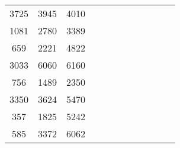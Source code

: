 \begin{table}[tb]
\begin{tabular}{|c|c|c|ccccccccc}
		3725 & 3945 & 4010 &                           &                           &                           &                           &                           &                           &                           &                           &                           \\ \cline{1-3}
		1081 & 2780 & 3389 &                           &                           &                           &                           &                           &                           &                           &                           &                           \\ \cline{1-3}
		659  & 2221 & 4822 &                           &                           &                           &                           &                           &                           &                           &                           &                           \\ \cline{1-3}
		3033 & 6060 & 6160 &                           &                           &                           &                           &                           &                           &                           &                           &                           \\ \cline{1-3}
		756  & 1489 & 2350 &                           &                           &                           &                           &                           &                           &                           &                           &                           \\ \cline{1-3}
		3350 & 3624 & 5470 &                           &                           &                           &                           &                           &                           &                           &                           &                           \\ \cline{1-3}
		357  & 1825 & 5242 &                           &                           &                           &                           &                           &                           &                           &                           &                           \\ \cline{1-3}
		585  & 3372 & 6062 &                           &                           &                           &                           &                           &                           &                           &                           &                           \\ \cline{1-3}

\end{tabular}
\end{table}
